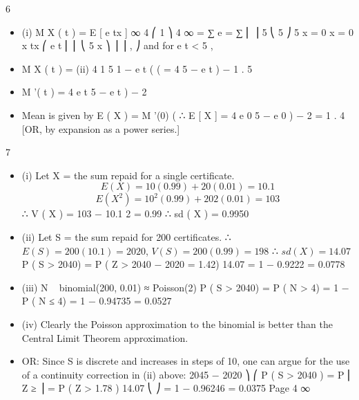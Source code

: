 \documentclass[a4paper,12pt]{article}
\begin{document}
6
\begin{itemize}
\item (i)
M X ( t ) = E [ e tx ]
∞
4 ⎛ 1 ⎞
4 ∞
= ∑ e
=
∑
⎜ ⎟
5 ⎝ 5 ⎠
5 x = 0
x = 0
x
tx
⎛ e t
⎜ ⎜
⎝ 5
x
⎞
⎟ ⎟ ,
⎠
and for e t < 5 ,
\item M X ( t ) =
(ii)
4 1
5 1 − e t
(
(
= 4 5 − e t
)
− 1
.
5
\item M '( t ) = 4 e t 5 − e t
)
− 2
\item Mean is given by E ( X ) = M '(0)
(
∴ E [ X ] = 4 e 0 5 − e 0
)
− 2
=
1
.
4
[OR, by expansion as a power series.]
\end{itemize}
7
\begin{itemize}
\item (i)
Let X = the sum repaid for a single certificate.
\[E ( X ) = 10(0.99) + 20(0.01) = 10.1\]
\[E ( X^2 ) = 10^2 (0.99) + 20 2 (0.01) = 103\]
∴ V ( X ) = 103 − 10.1 2 = 0.99 ∴ sd ( X ) = 0.9950
\item (ii)
Let S = the sum repaid for 200 certificates.
∴ $E ( S ) = 200(10.1) = 2020$, $V ( S ) = 200(0.99) = 198$ ∴ $sd ( X ) = 14.07$
P ( S > 2040) = P ( Z >
2040 − 2020
= 1.42)
14.07
= 1 − 0.9222 = 0.0778
\item (iii)
N ~ binomial(200, 0.01) ≈ Poisson(2)
P ( S > 2040) = P ( N > 4)
= 1 − P ( N ≤ 4) = 1 − 0.94735 = 0.0527
\item (iv)
Clearly the Poisson approximation to the binomial is better than the Central
Limit Theorem approximation.

\item OR:
Since S is discrete and increases in steps of 10, one can argue for the use of a
continuity correction in (ii) above:
2045 − 2020 ⎞
⎛
P ( S > 2040 ) = P ⎜ Z ≥
⎟ = P ( Z > 1.78 )
14.07
⎝
⎠
= 1 − 0.96246 = 0.0375
Page 4%
∞
\end{itemize}
\end{document}

